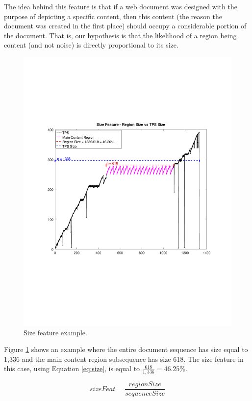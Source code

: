 The idea behind this feature is that if a web document was designed with the
purpose of depicting a specific content, then this content (the reason the
document was created in the first place) should occupy a considerable portion of
the document. That is, our hypothesis is that the likelihood of a region being
content (and not noise) is directly proportional to its size.

\begin{figure}[h]
  \centering
     \includegraphics[trim={2.5cm 7.4cm 2.2cm 7.4cm}, clip,  width=\columnwidth]{img/size.pdf}
  \caption{Size feature example.}
  \label{fig:size}
\end{figure}

Figure \ref{fig:size} shows an example where the entire document sequence has
size equal to 1,336 and the main content region subsequence has size 618. The
size feature in this case, using Equation \ref{eq:size}, is equal to
$\frac{618}{1,336} = 46.25\%$.

\begin{equation}\label{eq:size}
    sizeFeat = \frac{regionSize}{sequenceSize}
\end{equation}

